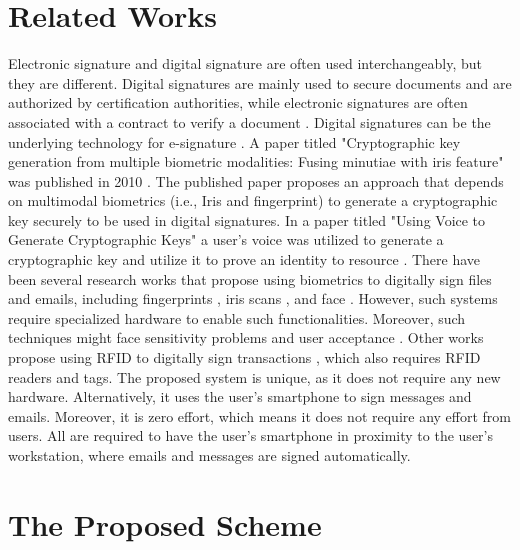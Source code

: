 \documentclass[sigconf]{acmart}
\begin{document}
\section{Related Works}
Electronic signature and digital signature are often used interchangeably, but they are different. Digital signatures are mainly used to secure documents and are authorized by certiﬁcation authorities, while electronic signatures are often associated with a contract to verify a document \cite{ref2}. Digital signatures can be the underlying technology for e-signature \cite{ref14}. A paper titled "Cryptographic key generation from multiple biometric modalities: Fusing minutiae with iris feature" was published in 2010 \cite{ref7}. The published paper proposes an approach that depends on multimodal biometrics (i.e., Iris and ﬁngerprint) to generate a cryptographic key securely to be used in digital signatures. In a paper titled "Using Voice to Generate Cryptographic Keys" a user's voice was utilized to generate a cryptographic key and utilize it to prove an identity to resource \cite{ref11}. There have been several research works that propose using biometrics to digitally sign ﬁles and emails, including ﬁngerprints \cite{ref12}, iris scans \cite{ref13}, and face \cite{ref4}. However, such systems require specialized hardware to enable such functionalities. Moreover, such techniques might face sensitivity problems \cite{ref6} and user acceptance \cite{ref6}. Other works propose using RFID to digitally sign transactions \cite{ref10}, which also requires RFID readers and tags. The proposed system is unique, as it does not require any new hardware. Alternatively, it uses the user's smartphone to sign messages and emails. Moreover, it is zero effort, which means it does not require any effort from users. All are required to have the user's smartphone in proximity to the user's workstation, where emails and messages are signed automatically.

\section{The Proposed Scheme}
\end{document}
